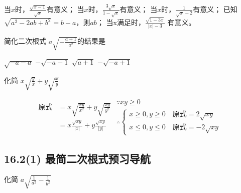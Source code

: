 \documentclass[answers]{exam} %
\begin{document}
\begin{questions}

\question
当$x$\fillin[$ \ge 1$]时，$\frac{\sqrt{x-1}}{\sqrt{x}}$有意义；
当$x$\fillin[$\ne 1 \mbox{且} x \ge 0$]时，$\frac{3\sqrt{x}}{1-\sqrt{x}}$有意义；
当$x$\fillin[$\ge 0 \mbox{且} x \ne 4$]时，$\frac{1}{\sqrt{x}-2}$有意义；
已知$\sqrt{a^2-2ab+b^2}=b-a$，则$a$\fillin[$\le$]$b$；
当x满足时，$\frac{\sqrt{1-3x}}{| x | - 3} $ 有意义。

\question
简化二次根式 $a\sqrt{-\frac{a+1}{a^2}}$的结果是\fillin

  \begin{choices}
  \choice $\sqrt{-a-a}$
  \correctchoice $-\sqrt{-a-1}$
  \choice $\sqrt{a+1}$
  \choice $-\sqrt{-a+1}$
  \end{choices}
    
\question 化简 $x \sqrt{\frac{y}{x}} + y \sqrt{\frac{x}{y}}$

  \vspace*{1in}
  \begin{solution}
  \[
    \begin{aligned}
      \mbox{原式}
      & = x \sqrt{\frac{xy}{x^2}} + y \sqrt{\frac{xy}{y^2}} \\
      & = x \frac{\sqrt{xy}}{|x|} + y \frac{\sqrt{xy}}{|y|}
    \end{aligned}
      \begin{split}
      \because xy \ge 0 \\
      \therefore
      \begin{cases}
        x \ge 0, y \ge 0 \quad \mbox{原式} = 2 \sqrt{xy} \\
        x \le 0, y \le 0 \quad \mbox{原式} = - 2 \sqrt{xy}
      \end{cases}
    \end{split} 
\]
\end{solution}  

\end{questions}

\subsection{16.2(1) 最简二次根式预习导航}

\begin{questions}
  
\question 化简 $a\sqrt{\frac{1}{a^2}-\frac{1}{b^2}}$

\end{questions}
\end{document}
